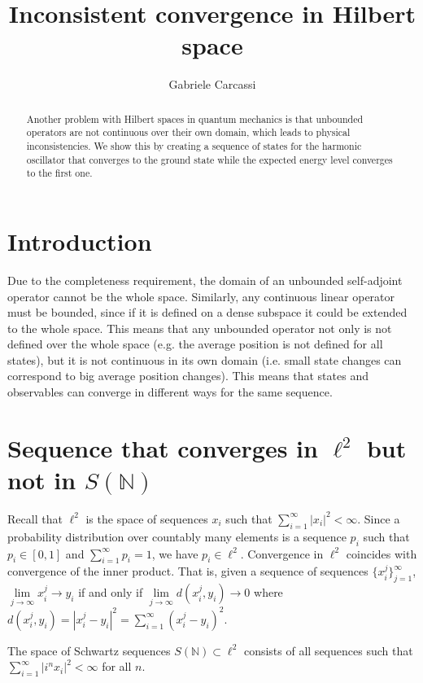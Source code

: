 \documentclass{techbrief}
\title{Inconsistent convergence in Hilbert space}
\author{Gabriele Carcassi}
\begin{document}
	
\maketitle
	
\begin{abstract}
	Another problem with Hilbert spaces in quantum mechanics is that unbounded operators are not continuous over their own domain, which leads to physical inconsistencies. We show this by creating a sequence of states for the harmonic oscillator that converges to the ground state while the expected energy level converges to the first one.
\end{abstract}

\section{Introduction}

Due to the completeness requirement, the domain of an unbounded self-adjoint operator cannot be the whole space. Similarly, any continuous linear operator must be bounded, since if it is defined on a dense subspace it could be extended to the whole space. This means that any unbounded operator not only is not defined over the whole space (e.g. the average position is not defined for all states), but it is not continuous in its own domain (i.e. small state changes can correspond to big average position changes). This means that states and observables can converge in different ways for the same sequence.

\section{Sequence that converges in $\ell^2$ but not in $S(\mathbb{N})$}

Recall that $\ell^2$ is the space of sequences $x_i$ such that $\sum_{i=1}^{\infty} |x_i|^2 < \infty$. Since a probability distribution over countably many elements is a sequence $p_i$ such that $p_i \in [0,1]$ and $\sum_{i=1}^{\infty} p_i = 1$, we have $p_i \in \ell^2$. Convergence in $\ell^2$ coincides with convergence of the inner product. That is, given a sequence of sequences $\{ x^j_i\}_{j=1}^{\infty}$, $\lim\limits_{j \to \infty} x^j_i \to y_i$ if and only if $\lim\limits_{j \to \infty} d(x^j_i, y_i) \to 0$ where $d(x^j_i, y_i) = |x^j_i - y_i|^2 = \sum_{i=1}^{\infty} (x^j_i - y_i)^2$.

The space of Schwartz sequences $S(\mathbb{N}) \subset \ell^2$ consists of all sequences such that $\sum_{i=1}^{\infty} |i^n x_i|^2 < \infty$ for all $n$.
\end{document}
